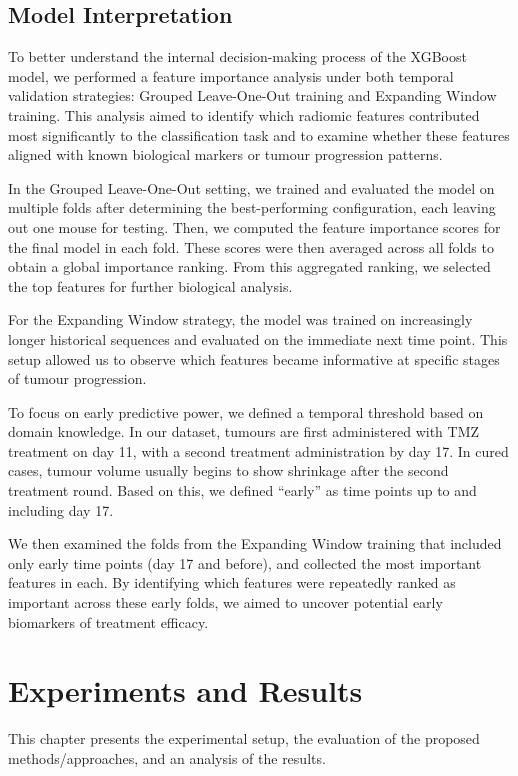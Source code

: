 \documentclass[12pt, a4paper]{report}
\begin{document}
\section{Model Interpretation}

To better understand the internal decision-making process of the XGBoost model, we performed a feature importance analysis under both temporal validation strategies: Grouped Leave-One-Out training and Expanding Window training. This analysis aimed to identify which radiomic features contributed most significantly to the classification task and to examine whether these features aligned with known biological markers or tumour progression patterns.

In the Grouped Leave-One-Out setting, we trained and evaluated the model on multiple folds after determining the best-performing configuration, each leaving out one mouse for testing. Then, we computed the feature importance scores for the final model in each fold. These scores were then averaged across all folds to obtain a global importance ranking. From this aggregated ranking, we selected the top features for further biological analysis. 

For the Expanding Window strategy, the model was trained on increasingly longer historical sequences and evaluated on the immediate next time point. This setup allowed us to observe which features became informative at specific stages of tumour progression.

To focus on early predictive power, we defined a temporal threshold based on domain knowledge. In our dataset, tumours are first administered with TMZ treatment on day 11, with a second treatment administration by day 17. In cured cases, tumour volume usually begins to show shrinkage after the second treatment round. Based on this, we defined “early” as time points up to and including day 17.

We then examined the folds from the Expanding Window training that included only early time points (day 17 and before), and collected the most important features in each. By identifying which features were repeatedly ranked as important across these early folds, we aimed to uncover potential early biomarkers of treatment efficacy.

\chapter{Experiments and Results}

This chapter presents the experimental setup, the evaluation of the proposed methods/approaches, and an analysis of the results. 
\end{document}
